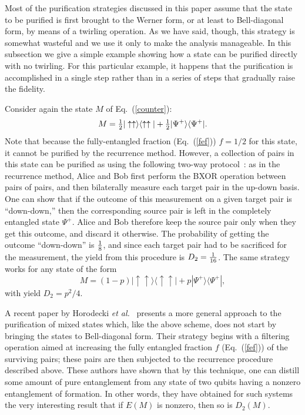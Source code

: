 Most of the purification strategies discussed in this paper assume
that the state to be purified is first brought to the Werner form,
or at least to Bell-diagonal form, by means of a twirling operation.
As we have said, though, this strategy
is somewhat wasteful and we use it only to make the analysis manageable.
In this subsection we give a simple example showing how a state can be
purified directly with no twirling.
For this particular example, it happens that the purification is
accomplished in a single step rather than in a series of steps that
gradually raise the fidelity.

Consider again the state $M$ of Eq.~(\ref{counter}):
\begin{equation}
M = \mbox{$\textstyle \frac{1}{2}$}|\uparrow\uparrow\rangle\langle\uparrow\uparrow|
+ \mbox{$\textstyle \frac{1}{2}$}|\Psi^+\rangle\langle\Psi^+|. \label{nonBell}
\end{equation}
Note that because the fully-entangled fraction (Eq.~(\ref{fef})) 
$f=1/2$  for this state, it cannot be purified by the recurrence
method.  However,
a collection of pairs in this state can be purified as 
using the following two-way protocol~\cite{richard}:
as in the recurrence method, Alice and Bob first perform the
BXOR operation
between pairs of pairs,
and then bilaterally measure each target pair in the
up-down basis.  One can show that if the outcome of
this measurement on a given target pair is ``down-down,'' then
the corresponding source pair is left in the completely
entangled state $\Psi^+$.  Alice and Bob therefore keep
the source pair only when they get this outcome, and discard
it otherwise.  The probability
of getting the outcome ``down-down''
is ${1\over{8}}$, and since each target pair had to be
sacrificed for the measurement, the yield from this
procedure is $D_2={1\over{16}}$.
The same strategy works for any state of the form
\begin{equation}
M = (1-p)|\uparrow\uparrow\rangle\langle\uparrow\uparrow|
+ p|\Psi^+\rangle\langle\Psi^+|,
\end{equation}
with yield $D_2=p^2/4$.

A recent paper by Horodecki {\em et al.}~\cite{horodecki2}
presents a more general approach to the purification of
mixed states which, like the above scheme, does not start
by bringing the states to Bell-diagonal form.  Their strategy
begins with a
filtering operation aimed at increasing the
fully entangled fraction $f$ (Eq.~(\ref{fef})) of the surviving pairs;
these pairs are then subjected to
the recurrence procedure described above.
These authors have shown that by this technique, one can distill
some amount of pure entanglement from any state of
two qubits having a nonzero entanglement of formation.
In other words, they have obtained for such systems the
very interesting result that
if $E(M)$ is nonzero, then so is $D_2(M)$.

